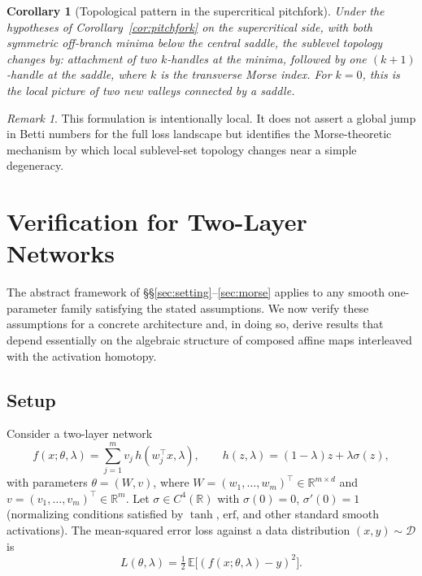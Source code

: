 \documentclass[11pt, reqno]{amsart}
\theoremstyle{plain}
\newtheorem{corollary}[theorem]{Corollary}
\theoremstyle{definition}
\theoremstyle{remark}
\newtheorem{remark}[theorem]{Remark}
\begin{document}
\begin{corollary}[Topological pattern in the supercritical pitchfork]\label{cor:topological-pattern}
Under the hypotheses of Corollary~\ref{cor:pitchfork} on the supercritical side, with both symmetric off-branch minima below the central saddle, the sublevel topology changes by: attachment of two $k$-handles at the minima, followed by one $(k+1)$-handle at the saddle, where $k$ is the transverse Morse index. For $k=0$, this is the local picture of two new valleys connected by a saddle.
\end{corollary}

\begin{remark}\label{rem:local-topology-only}
This formulation is intentionally local. It does not assert a global jump in Betti numbers for the full loss landscape but identifies the Morse-theoretic mechanism by which local sublevel-set topology changes near a simple degeneracy.
\end{remark}



\section{Verification for Two-Layer Networks}\label{sec:two-layer}

The abstract framework of \S\S\ref{sec:setting}--\ref{sec:morse} applies to any smooth one-parameter family satisfying the stated assumptions. We now verify these assumptions for a concrete architecture and, in doing so, derive results that depend essentially on the algebraic structure of composed affine maps interleaved with the activation homotopy.

\subsection{Setup}\label{ssec:two-layer-setup}

Consider a two-layer network
\begin{equation}\label{eq:two-layer}
  f(x;\theta,\lambda)=\sum_{j=1}^m v_j\, h(w_j^\top x,\lambda),
  \qquad
  h(z,\lambda)=(1-\lambda)z+\lambda \sigma(z),
\end{equation}
with parameters $\theta=(W,v)$, where $W=(w_1,\ldots,w_m)^\top\in\mathbb R^{m\times d}$ and $v=(v_1,\ldots,v_m)^\top\in\mathbb R^m$. Let $\sigma\in C^4(\mathbb R)$ with $\sigma(0)=0$, $\sigma'(0)=1$ (normalizing conditions satisfied by $\tanh$, $\text{erf}$, and other standard smooth activations). The mean-squared error loss against a data distribution $(x,y)\sim\mathcal D$ is
\begin{equation}\label{eq:loss-two-layer}
  L(\theta,\lambda)=\tfrac12\,\mathbb E\bigl[(f(x;\theta,\lambda)-y)^2\bigr].
\end{equation}
\end{document}
